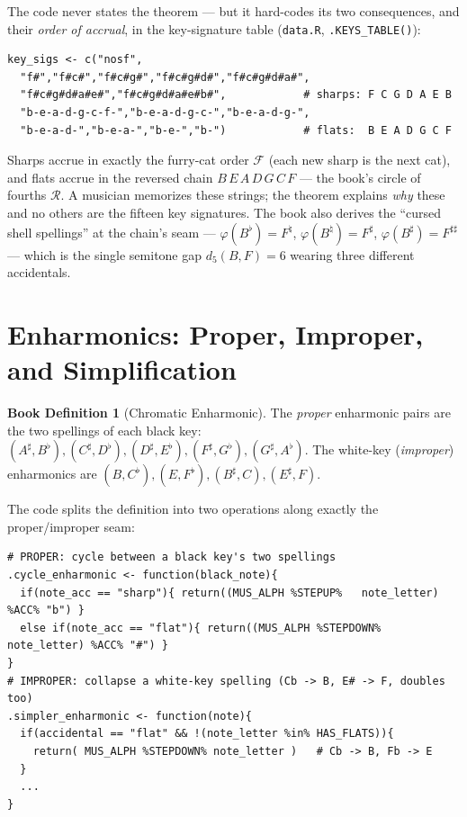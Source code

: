\documentclass[11pt]{article}
\newcommand{\FC}{\mathcal{F}}                   %
\theoremstyle{definition}
\newtheorem{bookdef}{Book Definition}[section]
\theoremstyle{remark}
\newcommand{\code}[1]{\texttt{#1}}
\newcommand{\file}[1]{\texttt{#1}}
\begin{document}
The code never states the theorem --- but it hard-codes its two consequences,
and their \emph{order of accrual}, in the key-signature table
(\file{data.R}, \code{.KEYS\_TABLE()}):

\begin{lstlisting}
key_sigs <- c("nosf",
  "f#","f#c#","f#c#g#","f#c#g#d#","f#c#g#d#a#",
  "f#c#g#d#a#e#","f#c#g#d#a#e#b#",            # sharps: F C G D A E B
  "b-e-a-d-g-c-f-","b-e-a-d-g-c-","b-e-a-d-g-",
  "b-e-a-d-","b-e-a-","b-e-","b-")            # flats:  B E A D G C F
\end{lstlisting}

Sharps accrue in exactly the furry-cat order $\FC$ (each new sharp is the next
cat), and flats accrue in the reversed chain $B\,E\,A\,D\,G\,C\,F$ --- the
book's circle of fourths $\mathcal{R}$. A musician memorizes these strings; the
theorem explains \emph{why} these and no others are the fifteen key signatures.
The book also derives the ``cursed shell spellings'' at the chain's seam ---
$\varphi(B^{\flat}) = F^{\natural}$, $\varphi(B^{\natural}) = F^{\sharp}$,
$\varphi(B^{\sharp}) = F^{\sharp\sharp}$ --- which is the single semitone gap
$d_5(B, F) = 6$ wearing three different accidentals.

\section{Enharmonics: Proper, Improper, and Simplification}\label{sec:enharmonics}

\begin{bookdef}[Chromatic Enharmonic]
The \emph{proper} enharmonic pairs are the two spellings of each black key:
$(A^{\sharp}, B^{\flat}), (C^{\sharp}, D^{\flat}), (D^{\sharp}, E^{\flat}),
(F^{\sharp}, G^{\flat}), (G^{\sharp}, A^{\flat})$. The white-key
(\emph{improper}) enharmonics are
$(B, C^{\flat}), (E, F^{\flat}), (B^{\sharp}, C), (E^{\sharp}, F)$.
\end{bookdef}

The code splits the definition into two operations along exactly the
proper/improper seam:

\begin{lstlisting}
# PROPER: cycle between a black key's two spellings
.cycle_enharmonic <- function(black_note){
  if(note_acc == "sharp"){ return((MUS_ALPH %STEPUP%   note_letter) %ACC% "b") }
  else if(note_acc == "flat"){ return((MUS_ALPH %STEPDOWN% note_letter) %ACC% "#") }
}
# IMPROPER: collapse a white-key spelling (Cb -> B, E# -> F, doubles too)
.simpler_enharmonic <- function(note){
  if(accidental == "flat" && !(note_letter %in% HAS_FLATS)){
    return( MUS_ALPH %STEPDOWN% note_letter )   # Cb -> B, Fb -> E
  }
  ...
}
\end{lstlisting}
\end{document}
